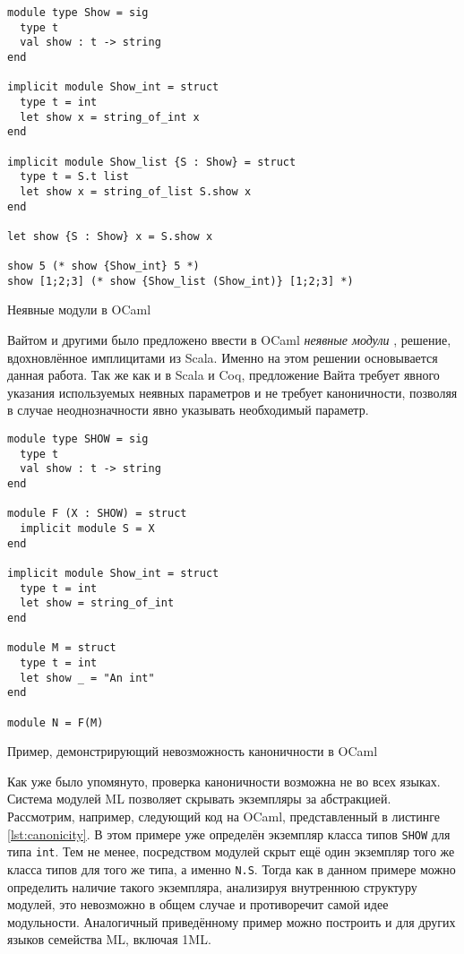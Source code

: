 \documentclass[../diploma.tex]{subfiles}
\begin{document}
\begin{listing}[H]
\begin{verbatim}
module type Show = sig
  type t
  val show : t -> string
end

implicit module Show_int = struct
  type t = int
  let show x = string_of_int x
end

implicit module Show_list {S : Show} = struct
  type t = S.t list
  let show x = string_of_list S.show x
end

let show {S : Show} x = S.show x

show 5 (* show {Show_int} 5 *)
show [1;2;3] (* show {Show_list (Show_int)} [1;2;3] *)
\end{verbatim}
\caption{Неявные модули в OCaml}
\label{lst:ocaml}
\end{listing}

Вайтом и другими было предложено ввести в OCaml \textit{неявные модули} \cite{white}, решение, вдохновлённое имплицитами из Scala. Именно на этом решении основывается данная работа. Так же как и в Scala и Coq, предложение Вайта требует явного указания используемых неявных параметров и не требует каноничности, позволяя в случае неоднозначности явно указывать необходимый параметр. 

\begin{listing}[H]
\begin{verbatim}
module type SHOW = sig
  type t
  val show : t -> string
end

module F (X : SHOW) = struct
  implicit module S = X
end

implicit module Show_int = struct
  type t = int
  let show = string_of_int
end

module M = struct
  type t = int
  let show _ = "An int"
end

module N = F(M)
\end{verbatim}
\caption{Пример, демонстрирующий невозможность каноничности в OCaml}
\label{lst:canonicity}
\end{listing}

Как уже было упомянуто, проверка каноничности возможна не во всех языках. Система модулей ML позволяет скрывать экземпляры за абстракцией. Рассмотрим, например, следующий код на OCaml, представленный в листинге \ref{lst:canonicity}. В этом примере уже определён экземпляр класса типов \texttt{SHOW} для типа \texttt{int}. Тем не менее, посредством модулей скрыт ещё один экземпляр того же класса типов для того же типа, а именно \texttt{N.S}. Тогда как в данном примере можно определить наличие такого экземпляра, анализируя внутреннюю структуру модулей, это невозможно в общем случае и противоречит самой идее модульности. Аналогичный приведённому пример можно построить и для других языков семейства ML, включая 1ML.
\end{document}
